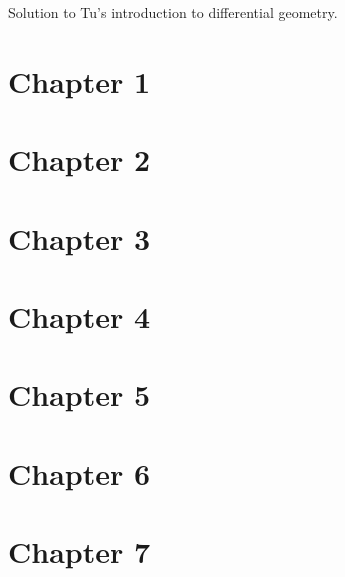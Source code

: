 \documentclass{book}
\begin{document}
Solution to Tu's introduction to differential geometry.

\chapter{Chapter 1}

\chapter{Chapter 2}
\chapter{Chapter 3}
\chapter{Chapter 4}
\chapter{Chapter 5}
\chapter{Chapter 6}
\chapter{Chapter 7}
\end{document}
